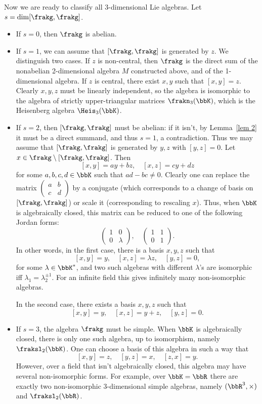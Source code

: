 Now we are ready to classify all 3-dimensional Lie algebras. Let $s=\dim[\frakg,\frakg]$.
\begin{itemize}
    \item If $s=0$, then $\frakg$ is abelian.
    \item If $s=1$, we can assume that $[\frakg,\frakg]$ is generated by $z$. We distinguish two cases. If $z$ is non-central, then $\frakg$ is the direct sum of the nonabelian 2-dimensional algebra $M$ constructed above, and of the 1-dimensional algebra. If $z$ is central, there exist $x,y$ such that $[x,y]=z$. Clearly $x,y,z$ must be linearly independent, so the algebra is isomorphic to the algebra of strictly upper-triangular matrices $\frakn_3(\bbK)$, which is the Heisenberg algebra $\Heis_3(\bbK)$.
    \item If $s=2$, then $[\frakg,\frakg]$ must be abelian: if it isn't, by Lemma~\ref{lem 2} it must be a direct summand, and thus $s=1$, a contradiction. Thus we may assume that $[\frakg,\frakg]$ is generated by $y,z$ with $[y,z]=0$. Let $x\in \frakg\setminus[\frakg,\frakg]$. Then
    \[[x,y]=ay+bz,\quad [x,z]=cy+dz\]
    for some $a,b,c,d\in\bbK$ such that $ad-bc\neq 0$. Clearly one can replace the matrix $\begin{pmatrix}
        a&b\\c&d
    \end{pmatrix}$
    by a conjugate (which corresponds to a change of basis on $[\frakg,\frakg]$) or scale it (corresponding to rescaling $x$). Thus, when $\bbK$ is algebraically closed, this matrix can be reduced to one of the following Jordan forms:
    \[\begin{pmatrix}
        1&0\\
        0&\lambda
    \end{pmatrix},\quad 
    \begin{pmatrix}
        1&1\\
        0&1
    \end{pmatrix}.\]
    In other words, in the first case, there is a basis $x,y,z$ such that
    \[[x,y]=y,\quad [x,z]=\lambda z,\quad [y,z]=0,\]
    for some $\lambda\in\bbK^\ast$, and two such algebras with different $\lambda$'s are isomorphic iff $\lambda_1=\lambda_2^{\pm 1}$. For an infinite field this gives infinitely many non-isomorphic algebras. 

    In the second case, there exists a basis $x,y,z$ such that
    \[[x,y]=y,\quad [x,z]=y+z,\quad [y,z]=0.\]

    \item If $s=3$, the algebra $\frakg$ must be simple. When $\bbK$ is algebraically closed, there is only one such algebra, up to isomorphism, namely $\fraksl_2(\bbK)$. One can choose a basis of this algebra in such a way that 
    \[[x,y]=z,\quad [y,z]=x,\quad [z,x]=y.\]
    However, over a field that isn't algebraically closed, this algebra may have several non-isomorphic forms. For example, over $\bbK=\bbR$ there are exactly two non-isomorphic 3-dimensional simple algebras, namely $(\bbR^3,\times)$ and $\fraksl_2(\bbR)$.
\end{itemize}


